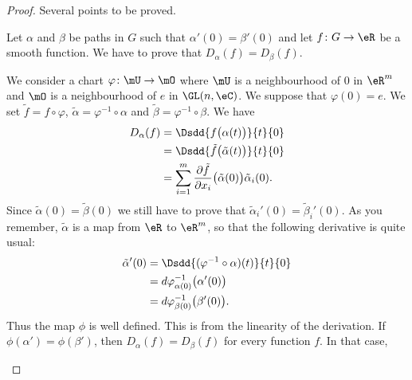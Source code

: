 \begin{proof}
    Several points to be proved.
    \begin{subproof}
            Let \( \alpha\) and \( \beta\) be paths in \( G\) such that \( \alpha'(0)=\beta'(0)\) and let \( f\colon G\to \eR\) be a smooth function. We have to prove that \( D_{\alpha}(f)=D_{\beta}(f)\).

            We consider a chart \( \varphi\colon \mU\to \mO\) where \( \mU\) is a neighbourhood of \( 0\) in \( \eR^m\) and \( \mO\) is a neighbourhood of \( e\) in \( \GL(n,\eC)\). We suppose that \( \varphi(0)=e\). We set \( \tilde f=f\circ \varphi\), \( \tilde \alpha=\varphi^{-1}\circ \alpha\) and \( \tilde \beta=\varphi^{-1}\circ\beta\). We have
            \begin{subequations}
                \begin{align}
                    D_{\alpha}(f)&=\Dsdd{ f\big( \alpha(t) \big) }{t}{0}\\
                    &=\Dsdd{ \tilde f\big( \tilde \alpha(t) \big) }{t}{0}\\
                    &=\sum_{i=1}^m\frac{ \partial \tilde f }{ \partial x_i }\big( \tilde \alpha(0) \big)\tilde \alpha_i(0).
                \end{align}
            \end{subequations}
            Since \( \tilde \alpha(0)=\tilde \beta(0)\) we still have to prove that \( \tilde \alpha_i'(0)=\tilde \beta_i'(0)\). As you remember, \( \tilde \alpha\) is a map from \( \eR\) to \( \eR^m\), so that the following derivative is quite usual:
            \begin{subequations}
                \begin{align}
                    \tilde \alpha'(0)&=\Dsdd{ (\varphi^{-1}\circ \alpha)(t) }{t}{0}\\
                    &=d\varphi^{-1}_{\alpha(0)}\big( \alpha'(0) \big)\\
                    &=d\varphi^{-1}_{\beta(0)}\big( \beta'(0) \big).
                \end{align}
            \end{subequations}
            Thus the map \( \phi\) is well defined.
            This is from the linearity of the derivation.
            If \( \phi(\alpha')=\phi(\beta')\), then \( D_{\alpha}(f)=D_{\beta}(f)\) for every function \( f\). In that case,
            \begin{equation}

\end{equation}
\end{subproof}
\end{proof}
